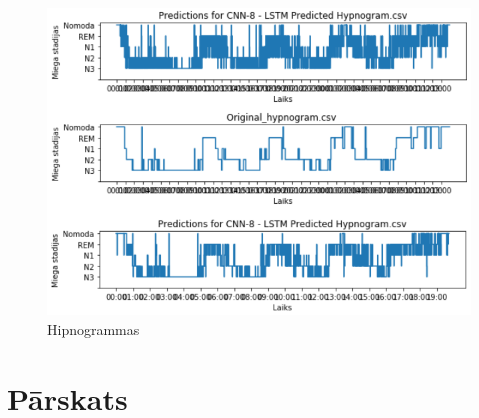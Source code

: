 \documentclass[12pt,paper=A4]{report}
\begin{document}
\begin{figure}[H] \centering
\includegraphics[width=1 \textwidth]{download123} 
\caption{Hipnogrammas}  \label{matmat} 
\end{figure}


\chapter*{Pārskats}
\end{document}
